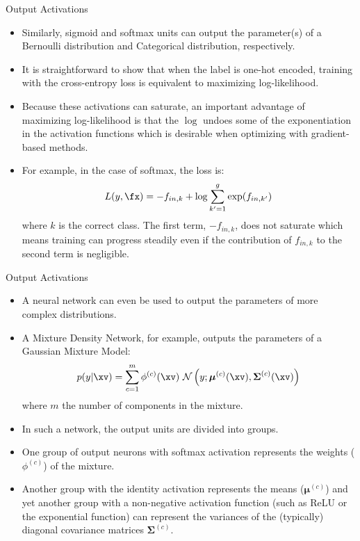 \documentclass[11pt,compress,t,notes=noshow, xcolor=table]{beamer}
\begin{document}
\begin{frame} {Output Activations}
  \begin{itemize}
    \item Similarly, sigmoid and softmax units can output the parameter(s) of a Bernoulli distribution and Categorical distribution, respectively.
    \item It is straightforward to show that when the label is one-hot encoded, training with the cross-entropy loss is equivalent to maximizing log-likelihood. \href{https://www.quora.com/What-are-the-differences-between-maximum-likelihood-and-cross-entropy-as-a-loss-function}{}

    \item Because these activations can saturate, an important advantage of maximizing log-likelihood is that the $\log$ undoes some of the exponentiation in the activation functions which is desirable when optimizing with gradient-based methods.
    \item For example, in the case of softmax, the loss is:
    $$ L(y, \fx) = - f_{in,k} + \log {\sum_{k'=1}^g\exp(f_{in,k'})}$$ where $k$ is the correct class. The first term, $- f_{in,k}$, does not saturate which means training can progress steadily even if the contribution of $f_{in,k}$ to the second term is negligible.
  \end{itemize}
\end{frame}

\begin{frame} {Output Activations}
  \begin{itemize}
    \item A neural network can even be used to output the parameters of more complex distributions.
    \item A Mixture Density Network, for example, outputs the parameters of a Gaussian Mixture Model:
$$p(y | \xv)=\sum_{c=1}^{m} \phi^{(c)} (\xv) ~ \mathcal{N}\left(y ; \boldsymbol{\mu}^{(c)}(\xv), \boldsymbol{\Sigma}^{(c)}(\xv)\right)$$
          where $m$ the number of components in the mixture.
    \item In such a network, the output units are divided into groups.
    \item One group of output neurons with softmax activation represents the weights ($\phi^{(c)}$) of the mixture.
    \item Another group with the identity activation represents the means ($\boldsymbol{\mu}^{(c)}$) and yet another group with a non-negative activation function (such as ReLU or the exponential function) can represent the variances of the (typically) diagonal covariance matrices $\boldsymbol{\Sigma}^{(c)}$.
  \end{itemize}
\end{frame}
\end{document}
